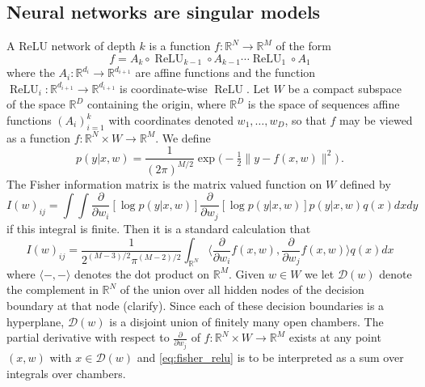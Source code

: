 \documentclass{article} %
\def\lto{\longrightarrow}
\begin{document}
\subsection{Neural networks are singular models}
\label{section:nn_singular}

A ReLU network of depth $k$ is a function $f: \mathbb{R}^N \lto \mathbb{R}^M$ of the form
\[
f = A_k \circ \operatorname{ReLU}_{k-1} \circ A_{k-1} \cdots \operatorname{ReLU}_1 \circ A_1
\]
where the $A_i: \mathbb{R}^{d_i} \lto \mathbb{R}^{d_{i+1}}$ are affine functions and the function $\operatorname{ReLU}_i: \mathbb{R}^{d_{i+1}} \lto \mathbb{R}^{d_{i+1}}$ is coordinate-wise $\operatorname{ReLU}$. Let $W$ be a compact subspace of the space $\mathbb{R}^D$ containing the origin, where $\mathbb{R}^D$ is the space of sequences affine functions $(A_i)_{i=1}^k$ with coordinates denoted $w_1,\ldots,w_D$, so that $f$ may be viewed as a function $f: \mathbb{R}^N \times W \lto \mathbb{R}^M$. We define
\[
p(y|x,w) = \frac{1}{(2 \pi)^{M/2}} \exp\Big(-\tfrac{1}{2} \| y - f(x,w) \|^2 \Big)\,.
\]
The Fisher information matrix is the matrix valued function on $W$ defined by
\[
I(w)_{ij} = \int\!\int \frac{\partial}{\partial w_i}[ \log p(y|x,w) ] \frac{\partial}{\partial w_j}[ \log p(y|x,w) ] p(y|x,w) q(x) dx dy
\]
if this integral is finite. Then it is a standard calculation that
\begin{equation}\label{eq:fisher_relu}
I(w)_{ij} = \frac{1}{2^{(M-3)/2} \pi^{(M-2)/2}} \int_{\mathbb{R}^N} \Big\langle \frac{\partial}{\partial w_i} f(x,w), \frac{\partial}{\partial w_j} f(x,w) \Big\rangle q(x) dx
\end{equation}
where $\langle -, - \rangle$ denotes the dot product on $\mathbb{R}^M$. Given $w \in W$ we let $\mathcal{D}(w)$ denote the complement in $\mathbb{R}^N$ of the union over all hidden nodes of the decision boundary at that node (clarify). Since each of these decision boundaries is a hyperplane, $\mathcal{D}(w)$ is a disjoint union of finitely many open chambers. The partial derivative with respect to $\frac{\partial}{\partial w_j}$ of $f: \mathbb{R}^N \times W \lto \mathbb{R}^M$ exists at any point $(x,w)$ with $x \in \mathcal{D}(w)$ and \eqref{eq:fisher_relu} is to be interpreted as a sum over integrals over chambers.
\end{document}
